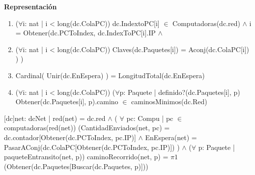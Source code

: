 \documentclass[a4paper,10pt]{article}
\newenvironment{Representacion}{%
  \vspace*{2ex}%
  \noindent\textbf{\Large Representación}%
  \vspace*{2ex}%
}{}
\begin{document}
\begin{Representacion}
{\begin{enumerate}
  \item ($\forall$i: nat | i < long(dc.ColaPC)) dc.IndextoPC[i] $\in$ Computadoras(dc.red) $\wedge$ i = Obtener(dc.PCToIndex, dc.IndexToPC[i].IP $\wedge$ 
  \item ($\forall$i: nat | i < long(dc.ColaPC)) Claves(dc.Paquetes[i]) = Aconj(dc.ColaPC[i]) ) )
  \item Cardinal( Unir(dc.EnEspera) ) = LongitudTotal(dc.EnEspera)
  \item ($\forall$i: nat | i < long(dc.ColaPC))  ($\forall$p: Paquete | definido?(dc.Paquetes[i], p) Obtener(dc.Paquetes[i], p).camino $\in$ caminosMinimos(dc.Red)
  \end{enumerate}
  }\mbox{}
  
  
  
  
  
  \BlankLine 	 
  
  [dc]{net: dcNet | red(net) = dc.red $\wedge$ ( $\forall$  pc: Compu | pc $\in$ computadoras(red(net)) (CantidadEnviados(net, pc) = dc.contador[Obtener(dc.PCToIndex, pc.IP)] $\wedge$ EnEspera(net) = PasarAConj(dc.ColaPC[Obtener(dc.PCToIndex, pc.IP)]) ) $\wedge$ ($\forall$ p: Paquete | paqueteEntransito(net, p)) caminoRecorrido(net, p) = $\pi1$(Obtener(dc.Paquetes[Buscar(dc.Paquetes, p)])) }
  
  \BlankLine
  \BlankLine
  
  
  

 
  
 	 
  \BlankLine
  
  
\end{Representacion}
\end{document}
